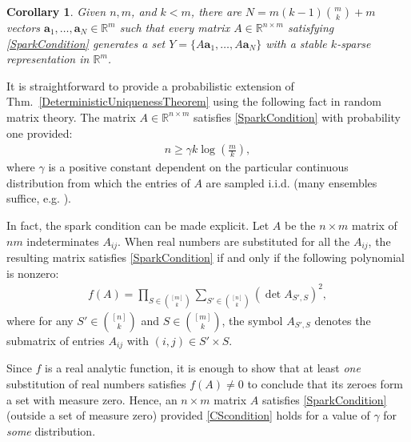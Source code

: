 \documentclass[journal, twocolumn]{IEEEtran}
\newtheorem{corollary}{Corollary}
\begin{document}
\begin{corollary}\label{DeterministicUniquenessCorollary}
Given $n, m$, and $k < m$, there are $N =  m(k-1){m \choose k}+m$ vectors \mbox{$\mathbf{a}_1, \ldots, \mathbf{a}_N \in \mathbb{R}^m$} such that every matrix $A \in \mathbb{R}^{n \times m}$ satisfying \eqref{SparkCondition} generates a set $Y = \{A\mathbf{a}_1, \ldots, A\mathbf{a}_N\}$ with a stable $k$-sparse representation in $\mathbb R^m$.
\end{corollary}

It is straightforward to provide a probabilistic extension of Thm.~\ref{DeterministicUniquenessTheorem} using the following fact in random matrix theory.  The matrix $A \in \mathbb{R}^{n \times m}$ satisfies \eqref{SparkCondition} with probability one
provided:
\begin{align}\label{CScondition}
n \geq \gamma k\log\left(\frac{m}{k}\right),
\end{align}
where $\gamma$ is a positive constant dependent on the particular continuous distribution from which the entries of $A$ are sampled i.i.d. (many ensembles suffice, e.g. \cite[Sec.~4]{Baraniuk08}). 

In fact, the spark condition can be made explicit.  Let $A$  be the $n \times m$ matrix of $nm$ indeterminates $A_{ij}$. When real numbers are substituted for all the $A_{ij}$, the resulting matrix satisfies \eqref{SparkCondition} if and only if the following polynomial is nonzero:
\begin{align*}
f(A) = \prod_{S \in {[m] \choose k}} \sum_{S' \in {[n] \choose k}} (\det A_{S',S})^2,
\end{align*}
%
where for any $S' \in {[n] \choose k}$ and $S \in {[m] \choose k}$, the symbol $A_{S',S}$ denotes the submatrix of entries $A_{ij}$ with $(i,j) \in S' \times S$. 

Since $f$ is a real analytic function, it is enough to show that at least \emph{one} substitution of real numbers satisfies $f(A) \neq 0$ to conclude that its zeroes form a set with measure zero. Hence, an $n \times m$ matrix $A$ satisfies \eqref{SparkCondition} (outside a set of measure zero) provided \eqref{CScondition} holds for a value of $\gamma$ for \emph{some}  distribution. 
\end{document}
